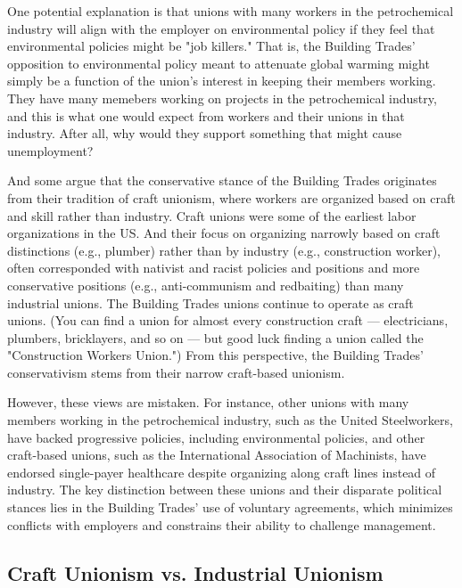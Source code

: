 \documentclass[12pt]{article}
\begin{document}
One potential explanation is that unions with many workers in the petrochemical industry will align with the employer on environmental policy if they feel that environmental policies might be "job killers." That is, the Building Trades' opposition to environmental policy meant to attenuate global warming might simply be a function of the union's interest in keeping their members working. They have many memebers working on projects in the petrochemical industry, and this is what one would expect from workers and their unions in that industry. After all, why would they support something that might cause unemployment?

And some argue that the conservative stance of the Building Trades originates from their tradition of craft unionism, where workers are organized based on craft and skill rather than industry. Craft unions were some of the earliest labor organizations in the US. And their focus on organizing narrowly based on craft distinctions (e.g., plumber) rather than by industry (e.g., construction worker), often corresponded with nativist and racist policies and positions and more conservative positions (e.g., anti-communism and redbaiting) than many industrial unions. The Building Trades unions continue to operate as craft unions. (You can find a union for almost every construction craft --- electricians, plumbers, bricklayers, and so on --- but good luck finding a union called the "Construction Workers Union.") From this perspective, the Building Trades' conservativism stems from their narrow craft-based unionism.

However, these views are mistaken. For instance, other unions with many members working in the petrochemical industry, such as the United Steelworkers, have backed progressive policies, including environmental policies, and other craft-based unions, such as the International Association of Machinists, have endorsed single-payer healthcare despite organizing along craft lines instead of industry. The key distinction between these unions and their disparate political stances lies in the Building Trades' use of voluntary agreements, which minimizes conflicts with employers and constrains their ability to challenge management.


\subsection{Craft Unionism vs. Industrial Unionism} \
\end{document}
